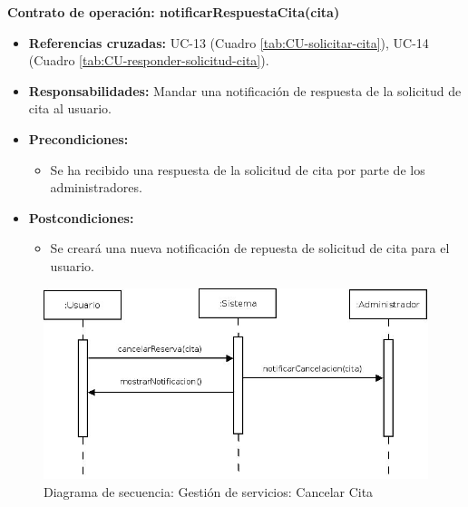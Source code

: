 \textbf{Contrato de operación: notificarRespuestaCita(cita)}
\begin{itemize}
\item \textbf{Referencias cruzadas:} UC-13 (Cuadro \ref{tab:CU-solicitar-cita}), UC-14 (Cuadro \ref{tab:CU-responder-solicitud-cita}).
\item \textbf{Responsabilidades:} Mandar una notificación de respuesta de la solicitud de cita al usuario.
\item \textbf{Precondiciones:} 
 \begin{itemize}
\item Se ha recibido una respuesta de la solicitud de cita por parte de los administradores.
\end {itemize}
\item \textbf{Postcondiciones:} 
 \begin{itemize}
\item Se creará una nueva notificación de repuesta de solicitud de cita para el usuario.
\end {itemize}
\end {itemize}


\vspace{10mm}

\begin{figure}[H]
\centering
  \includegraphics[scale=.50]{img/secuencias/gestion-servicios-cancelar-cita-por-parte-de-usuario.jpeg}
  \caption{Diagrama de secuencia: Gestión de servicios: Cancelar Cita}
  \label{fig:secuencia-gestion-servicios-cancelar-cita-por-parte-de-usuario}
\end{figure}

